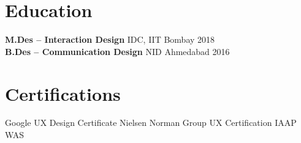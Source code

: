 \documentclass[10.5pt,a4paper]{article}
\begin{document}
\vspace{4pt}

\section{Education}
\textbf{M.Des -- Interaction Design} \hfill IDC, IIT Bombay \hfill 2018\\[3pt]
\textbf{B.Des -- Communication Design} \hfill NID Ahmedabad \hfill 2016

\vspace{4pt}

\section{Certifications}
Google UX Design Certificate \quad\textperiodcentered\quad Nielsen Norman Group UX Certification \quad\textperiodcentered\quad IAAP WAS
\end{document}
